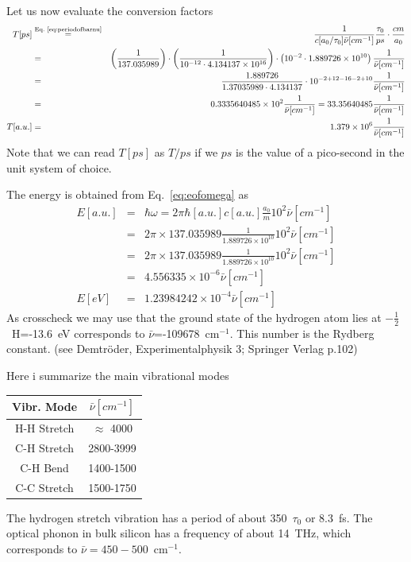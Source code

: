 \documentclass[final,12pt,makeidx,DIV=calc]{article}
\begin{document}
{{{Let us now evaluate the conversion factors
\begin{eqnarray*}
T[ps]&\stackrel{\textrm{Eq.~\ref{eq:periodofbarnu}}}{=}& \frac{1}{c[a_0/\tau_0]\bar{\nu}[cm^{-1}] } 
\frac{\tau_0}{ps}\cdot\frac{cm}{a_0}
\\
&=&
\left(\frac{1}{137.035989}\right)\cdot
\left(\frac{1}{10^{-12}\cdot 4.134137\times 10^{16}}\right)
\cdot\left(10^{-2}\cdot 1.889726\times 10^{10}\right)
\frac{1}{\bar{\nu}[cm^{-1}] } 
\\
&=&
\frac{1.889726}{1.37035989\cdot4.134137}\cdot10^{-2+12-16-2+10}
\frac{1}{\bar{\nu}[cm^{-1}] } 
\\
&=&0.3335640485\times10^{2}
\frac{1}{\bar{\nu}[cm^{-1}] } 
=33.35640485\frac{1}{\bar{\nu}[cm^{-1}] }
\\
T[a.u.]&=&1.379\times 10^6 \frac{1}{\bar{\nu}[cm^{-1}] }
\end{eqnarray*}
Note that we can read $T[ps]$ as $T/ps$ if we $ps$ is the value of a
pico-second in the unit system of choice.

The energy is obtained from Eq.~\ref{eq:eofomega} as
\begin{eqnarray*}
E[a.u.]&=&\hbar\omega=2\pi\hbar[a.u.] c[a.u.]\frac{a_0}{m}
10^2
\bar{\nu}[cm^{-1}]
\\
&=&2\pi\times 137.035989\frac{1}{1.889726\times 10^{10}}10^2\bar{\nu}[cm^{-1}]
\\
&=&2\pi\times 137.035989\frac{1}{1.889726\times 10^{10}}10^2\bar{\nu}[cm^{-1}]
\\
&=&4.556335\times10^{-6}\bar{\nu}[cm^{-1}]
\\
E[eV]&=&1.23984242\times10^{-4}\bar{\nu}[cm^{-1}]
\end{eqnarray*}
As crosscheck we may use that the ground state of the hydrogen atom lies at
$-\frac{1}{2}$~H=-13.6~eV corresponds to $\bar{\nu}$=-109678~cm$^{-1}$. This
number is the Rydberg constant. (see Demtr\"oder, Experimentalphysik 3;
Springer Verlag p.102)

Here i summarize the main vibrational modes
\begin{center}
\begin{tabular}{|c|c|}
\hline
Vibr. Mode & $\bar{\nu}[cm^{-1}]$\\ 
\hline
H-H Stretch & $\approx$ 4000\\
C-H Stretch & 2800-3999 \\
C-H Bend    & 1400-1500 \\
C-C Stretch & 1500-1750 \\
\hline
\end{tabular}
\end{center}
The hydrogen stretch vibration has a period of about 350~$\tau_0$ or 8.3~fs.
The optical phonon in bulk silicon has a frequency of about 14~THz, which
corresponds to $\bar{\nu}=450-500$~cm$^{-1}$.

}}}
\end{document}
